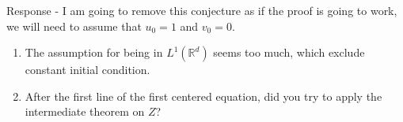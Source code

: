 \documentclass[a4paper,10pt]{article}
\def\R{\mathbb{R}}
\begin{document}
\begin{enumerate}
      Response - I am going to remove this conjecture as if the proof is going to work, we will need to assume that $u_0 =1 $ and $v_0 = 0$. 
        \begin{enumerate}
          \item The assumption for being in $L^1(\R^d)$ seems too much, which exclude constant initial condition.
          \item After the first line of the first centered equation, did you try to apply the intermediate theorem on
             $Z$?
        \end{enumerate}
\end{enumerate}
\end{document}
